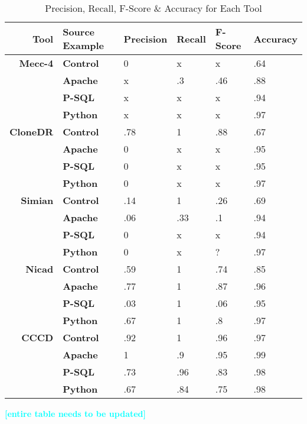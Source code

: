 \documentclass[smallextended]{svjour3}       %
\newcommand{\todo}[1]{\textcolor{cyan}{\textbf{[#1]}}}
\begin{document}
\begin{table}[thb!]

\begin{center}
\caption{Precision, Recall, F-Score \& Accuracy for Each Tool}
\label{Table:Allprecisionrecall}
\begin{tabular}{r||l|l|l|l|l}
\bfseries Tool & \bfseries Source Example & \bfseries Precision & \bfseries Recall & \bfseries F-Score & \bfseries Accuracy \\ \hline\hline
  \bfseries Mecc-4 & \bfseries Control & 0 & x & x & .64  \\ \cline{2-6}
& \bfseries Apache & x & .3 & .46 & .88 \\ \cline{2-6}
& \bfseries P-SQL & x & x & x & .94 \\ \cline{2-6}
& \bfseries Python & x & x & x & .97 \\ \cline{2-6}
 \hline \hline
  \bfseries CloneDR & \bfseries Control & .78 & 1 & .88 & .67   \\ \cline{2-6} %
& \bfseries Apache & 0 & x & x & .95 \\ \cline{2-6}
& \bfseries P-SQL & 0 & x & x & .95 \\ \cline{2-6}
& \bfseries Python & 0 & x & x & .97 \\ \cline{2-6}
 \hline \hline
  \bfseries Simian & \bfseries Control & .14 & 1 & .26 & .69   \\ \cline{2-6}
& \bfseries Apache & .06 & .33 & .1 & .94 \\ \cline{2-6}
& \bfseries P-SQL & 0 & x & x & .94 \\ \cline{2-6}
& \bfseries Python & 0 & x & ? & .97 \\ \cline{2-6}
 \hline \hline
  \bfseries Nicad & \bfseries Control & .59 & 1 & .74 & .85   \\ \cline{2-6}
& \bfseries Apache & .77 & 1 & .87 & .96 \\ \cline{2-6}
& \bfseries P-SQL & .03 & 1 & .06 & .95 \\ \cline{2-6}
& \bfseries Python & .67 & 1 & .8 & .97 \\ \cline{2-6}
 \hline \hline
  \bfseries CCCD & \bfseries Control & .92 & 1 & .96 & .97   \\ \cline{2-6}
& \bfseries Apache & 1 & .9 & .95 & .99 \\ \cline{2-6}
& \bfseries P-SQL & .73 & .96 & .83 & .98 \\ \cline{2-6}
& \bfseries Python & .67 & .84 & .75 & .98 \\ \cline{2-6}
 \hline %

\end{tabular}

\end{center}

\end{table}
\todo{entire table needs to be updated}
\end{document}
